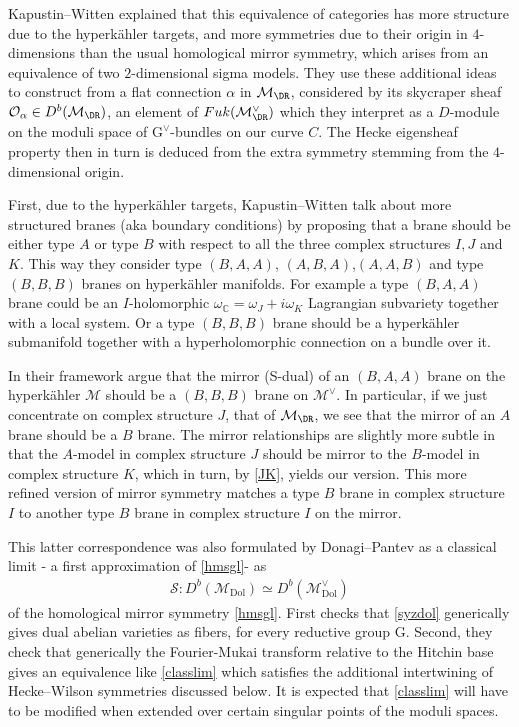 \documentclass[12pt]{article}
\numberwithin{equation}{section}
\theoremstyle{remark}
\numberwithin{theorem}{section}
\def\beq{\begin{eqnarray}}
\def\eeq{\end{eqnarray}}
\def\C{\mathbb{C}}
\def\M{{\mathcal{M}}}
\def\calO{{\mathcal O}}
\newcommand{\G}{\mathrm{G}}
\newcommand{\Dol}{{\mathrm{Dol}}}
\numberwithin{equation}{section}
\begin{document}
Kapustin--Witten \cite{kapustin-witten} explained that this equivalence of categories has more structure due to the hyperk\"ahler targets, and more symmetries due to their origin in $4$-dimensions than the usual homological mirror symmetry, which arises from an equivalence of two $2$-dimensional sigma models. They use these additional ideas to construct from a flat connection $\alpha$ in $\M_\DR$, considered by its skycraper sheaf $\calO_\alpha\in D^b(\M_\DR)$, an element of $Fuk(\M^\vee_\DR)$ which they interpret as a $D$-module on the moduli space of $\G^\vee$-bundles on our curve $C$. The Hecke eigensheaf property  then in turn is deduced from the extra symmetry stemming from the $4$-dimensional origin.



First, due to the hyperk\"ahler targets, Kapustin--Witten talk about more structured branes (aka boundary conditions) by proposing that a brane should be either type $A$ or type $B$ with respect to all the three complex structures $I,J$ and $K$. This way they consider type $(B,A,A)$, $(A,B,A)$,$(A,A,B)$ and type $(B,B,B)$ branes on hyperk\"ahler manifolds. For example a type $(B,A,A)$ brane could be an $I$-holomorphic $\omega_\C=\omega_J+i\omega_K$ Lagrangian subvariety together with a local system. Or a type $(B,B,B)$ brane should be a hyperk\"ahler submanifold together with a hyperholomorphic connection on a bundle over it. 

In their framework \cite{kapustin-witten} argue that the mirror (S-dual) of an $(B,A,A)$ brane on the hyperk\"ahler $\M$ should be a $(B,B,B)$ brane on $\M^\vee$. In particular, if we just concentrate on complex structure $J$, that of $\M_{\DR}$, we see that the mirror of an $A$ brane should be a $B$ brane. 
The mirror relationships are slightly more subtle \cite[Table 2 p74]{kapustin-witten} in that the $A$-model in complex structure $J$ should be mirror to the $B$-model in complex structure $K$, which in turn, by \eqref{JK}, yields our version. 
This more refined version of mirror symmetry matches a type $B$ brane in complex structure $I$ to another type $B$ brane in complex structure $I$ on the mirror. 

This latter correspondence was also formulated by Donagi--Pantev \cite{donagi-pantev} as a classical limit - a first approximation of \eqref{hmsgl}- as \beq \label{classlim}\mathscr{S}:D^b(\M_\Dol)\simeq D^b(\M_\Dol^\vee)\eeq of the homological mirror symmetry \eqref{hmsgl}. First \cite{donagi-pantev} checks that \eqref{syzdol}  generically gives dual abelian varieties as fibers, for every reductive group $\G$. Second, they check that generically the Fourier-Mukai transform \cite{mukai} relative to the Hitchin base gives an equivalence like \eqref{classlim} which satisfies the additional intertwining of Hecke--Wilson symmetries discussed below. It is expected that \eqref{classlim} will have to be modified when extended over certain singular points of the moduli spaces.
\end{document}
